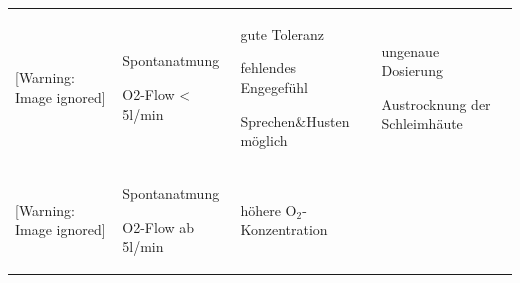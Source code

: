 \documentclass{article}
\newcommand\gSub[1]{\ensuremath{{}_{\text{#1}}}}
\begin{document}
\begin{center}
\tablehead{}\begin{supertabular}{|m{3.225cm}|m{3.225cm}|m{3.225cm}|m{3.225cm}|}
\hline
{}\par

 &
\par

 &
\par

 &
\par

\\\hline
{}\par



\begin{center}
 [Warning: Image ignored] %

\end{center}
 &
{\mdseries Spontanatmung}

{\mdseries O2-Flow {\textless} 5l/min}

 &
{\mdseries gute Toleranz}

{\mdseries fehlendes Engegef\"uhl}

{\mdseries Sprechen\&Husten m\"oglich}

 &
{\mdseries ungenaue Dosierung}

{\mdseries Austrocknung  der Schleimh\"aute}

\\\hline
{}\par



\begin{center}
 [Warning: Image ignored] %

\end{center}
 &
{\mdseries Spontanatmung}

{\mdseries O2-Flow ab 5l/min}

 &
{\mdseries h\"ohere O\gSub{2}{}-Konzentration}


\end{supertabular}
\end{center}
\end{document}
